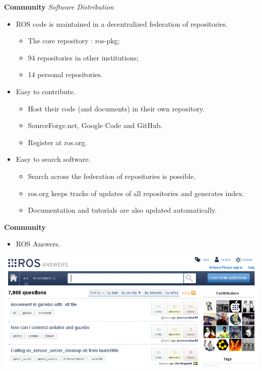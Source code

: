 \documentclass[a4paper, 10pt, conference]{ieeeconf}       %
\begin{document}
\textbf{Community}
\textit{Software Distribution}

\begin{itemize}
  \item ROS code is maintained in a decentralized federation of repositories.
  \begin{itemize}
    \item The core repository : ros-pkg;
    \item 94 repositories in other institutions;
    \item 14 personal repositories.
  \end{itemize}
  \item Easy to contribute.
  \begin{itemize}
    \item Host their code (and documents) in their own repository.
    \item SourceForge.net, Google Code and GitHub.
    \item Register at ros.org.
  \end{itemize}
  \item Easy to search software.
  \begin{itemize}
    \item Search across the federation of repositories is possible.
    \item ros.org keeps tracks of updates of all repositories and generates index.
    \item Documentation and tutorials are also updated automatically.
  \end{itemize}
\end{itemize}




\textbf{Community}

\begin{itemize}
  \item ROS Answers.
\end{itemize}
\begin{center}
  \includegraphics[width=\textwidth]{ros_answers}
\end{center}
\end{document}
